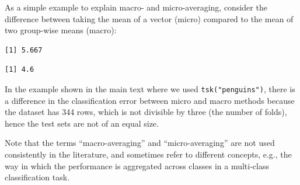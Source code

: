 \begin{tcolorbox}[enhanced jigsaw, opacitybacktitle=0.6, rightrule=.15mm, opacityback=0, arc=.35mm, breakable, titlerule=0mm, colframe=quarto-callout-tip-color-frame, coltitle=black, bottomrule=.15mm, toprule=.15mm, colback=white, colbacktitle=quarto-callout-tip-color!10!white, bottomtitle=1mm, toptitle=1mm, title=\textcolor{quarto-callout-tip-color}{\faLightbulb}\hspace{0.5em}{Macro- and Micro-Averaging}, leftrule=.75mm, left=2mm]

As a simple example to explain macro- and micro-averaging, consider the
difference between taking the mean of a vector (micro) compared to the
mean of two group-wise means (macro):

\begin{Shaded}
\begin{Highlighting}[]
\NormalTok{(}\NormalTok{(}\NormalTok{(}\NormalTok{, }\NormalTok{, }\NormalTok{)), }\NormalTok{(}\NormalTok{(}\NormalTok{, }\NormalTok{)))}
\end{Highlighting}
\end{Shaded}

\begin{verbatim}
[1] 5.667
\end{verbatim}

\begin{Shaded}
\begin{Highlighting}[]
\NormalTok{(}\NormalTok{(}\NormalTok{, }\NormalTok{, }\NormalTok{, }\NormalTok{, }\NormalTok{))}
\end{Highlighting}
\end{Shaded}

\begin{verbatim}
[1] 4.6
\end{verbatim}

In the example shown in the main text where we used
\texttt{tsk("penguins")}, there is a difference in the classification
error between micro and macro methods because the dataset has 344 rows,
which is not divisible by three (the number of folds), hence the test
sets are not of an equal size.

Note that the terms ``macro-averaging'' and ``micro-averaging'' are not
used consistently in the literature, and sometimes refer to different
concepts, e.g., the way in which the performance is aggregated across
classes in a multi-class classification task.

\end{tcolorbox}

